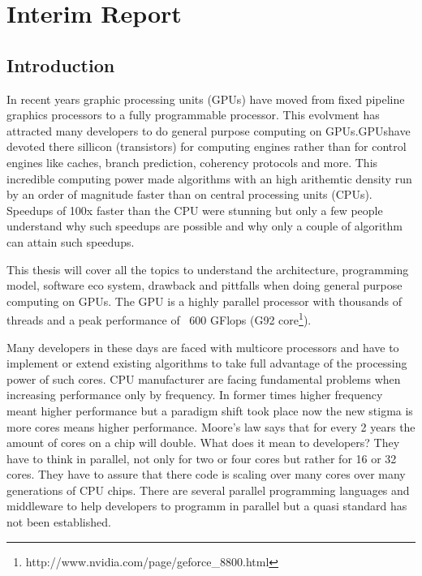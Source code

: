 \chapter{Interim Report}
\label{ch:interim_report}
\section*{Introduction} 
\label{sub:introduction} 

In recent years graphic processing units (GPUs) have moved from fixed pipeline
graphics processors to a fully programmable processor. This evolvment has
attracted many developers to do general purpose computing on GPUs.\glspl{GPU}have
devoted there sillicon (transistors) for computing engines rather than for
control engines like caches, branch prediction, coherency protocols and more.
This incredible computing power made algorithms with an high arithemtic density
run by an order of magnitude faster than on central processing units (CPUs).
Speedups of 100x faster than the CPU were stunning but only a few people
understand why such speedups are possible and why only a couple of algorithm can
attain such speedups.

This thesis will cover all the topics to understand the architecture,
programming model, software eco system, drawback and pittfalls when doing
general purpose computing on GPUs. The \gls{GPU} is a highly parallel processor with
thousands of threads and a peak performance of ~600 GFlops (G92
core\footnote{http://www.nvidia.com/page/geforce\_8800.html}).

Many developers in these days are faced with multicore processors and have to
implement or extend existing algorithms to take full advantage of the
processing power of such cores. CPU manufacturer are facing fundamental problems
when increasing performance only by frequency. In former times higher frequency
meant higher performance but a paradigm shift took place now the new stigma is
more cores means higher performance. Moore's law says that for every 2 years the
amount of cores on a chip will double. What does it mean to developers? They
have to think in parallel, not only for two or four cores but rather for 16 or
32 cores. They have to assure that there code is scaling over many cores over
many generations of CPU chips. There are several parallel programming languages
and middleware to help developers to programm in parallel but a quasi standard
has not been established.

